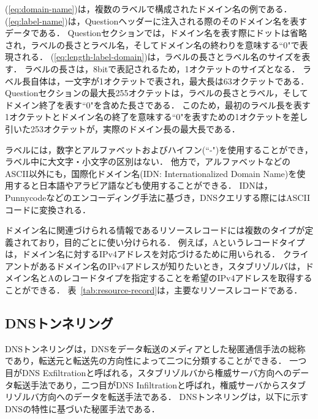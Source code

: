 (\ref{eq:domain-name})は，複数のラベルで構成されたドメイン名の例である．
(\ref{eq:label-name})は，Questionヘッダーに注入される際のそのドメイン名を表すデータである．
Questionセクションでは，ドメイン名を表す際にドットは省略され，ラベルの長さとラベル名，そしてドメイン名の終わりを意味する``0"で表現される．
(\ref{eq:length-label-domain})は，ラベルの長さとラベル名のサイズを表す．
ラベルの長さは，8bitで表記されるため，1オクテットのサイズとなる．
ラベル長自体は，一文字が1オクテットで表され，最大長は63オクテットである．
Questionセクションの最大長255オクテットは，ラベルの長さとラベル，そしてドメイン終了を表す``0"を含めた長さである．
このため，最初のラベル長を表す1オクテットとドメイン名の終了を意味する``0"を表すための1オクテットを差し引いた253オクテットが，実際のドメイン長の最大長である．


ラベルには，数字とアルファベットおよびハイフン(``-")を使用することができ，ラベル中に大文字・小文字の区別はない．
他方で，アルファベットなどのASCII以外にも，国際化ドメイン名(IDN: Internationalized Domain Name)を使用すると日本語やアラビア語なども使用することができる．
IDNは，Punnycodeなどのエンコーディング手法に基づき，DNSクエリする際にはASCIIコードに変換される．

ドメイン名に関連づけられる情報であるリソースレコードには複数のタイプが定義されており，目的ごとに使い分けられる．
例えば，Aというレコードタイプは，ドメイン名に対するIPv4アドレスを対応づけるために用いられる．
クライアントがあるドメイン名のIPv4アドレスが知りたいとき，スタブリゾルバは，ドメイン名とAのレコードタイプを指定することを希望のIPv4アドレスを取得することができる．
表~\ref{tab:resource-record}は，主要なリソースレコードである．




\subsection{DNSトンネリング}
DNSトンネリングは，DNSをデータ転送のメディアとした秘匿通信手法の総称であり，転送元と転送先の方向性によって二つに分類することができる．
一つ目がDNS Exfiltrationと呼ばれる，スタブリゾルバから権威サーバ方向へのデータ転送手法であり，二つ目がDNS Infiltrationと呼ばれ，権威サーバからスタブリゾルバ方向へのデータを転送手法である．
DNSトンネリングは，以下に示すDNSの特性に基づいた秘匿手法である．

